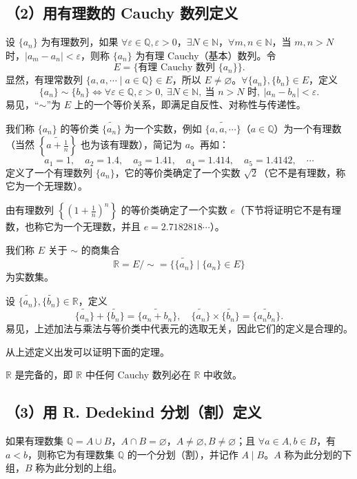 \subsection*{（2）用有理数的 Cauchy 数列定义}
设 $\{a_n\}$ 为有理数列，如果 $\forall \varepsilon \in \mathbb{Q}, \varepsilon > 0$，$\exists N \in \mathbb{N}$，$\forall m, n \in \mathbb{N}$，当 $m, n > N$ 时，$|a_m - a_n| < \varepsilon$，则称 $\{a_n\}$ 为有理 Cauchy（基本）数列。令
\[
E = \{\text{有理 Cauchy 数列 } \{a_n\}\}.
\]
显然，有理常数列 $\{a, a, \cdots \mid a \in \mathbb{Q}\} \in E$，所以 $E \neq \varnothing$。$\forall \{a_n\}, \{b_n\} \in E$，定义
\[
\{a_n\} \sim \{b_n\} \iff \forall \varepsilon \in \mathbb{Q}, \varepsilon > 0,\ \exists N \in \mathbb{N},\ \text{当 } n > N \text{ 时},\ |a_n - b_n| < \varepsilon.
\]
易见，“$\sim$”为 $E$ 上的一个等价关系，即满足自反性、对称性与传递性。

我们称 $\{a_n\}$ 的等价类 $\widetilde{\{a_n\}}$ 为一个实数，例如 $\widetilde{\{a, a, \cdots\}}$（$a \in \mathbb{Q}$）为一个有理数（当然 $\left\{\widetilde{a + \frac{1}{n}}\right\}$ 也为该有理数），简记为 $a$。再如：
\[
a_1 = 1,\quad a_2 = 1.4,\quad a_3 = 1.41,\quad a_4 = 1.414,\quad a_5 = 1.4142,\quad \cdots
\]
定义了一个有理数列 $\{a_n\}$，它的等价类确定了一个实数 $\sqrt{2}$（它不是有理数，称它为一个无理数）。

由有理数列 $\left\{\left(1 + \frac{1}{n}\right)^n\right\}$ 的等价类确定了一个实数 $e$（下节将证明它不是有理数，也称它为一个无理数，并且 $e = 2.7182818\cdots$）。

我们称 $E$ 关于 $\sim$ 的商集合
\[
\mathbb{R} = E/{\sim} = \{\widetilde{\{a_n\}} \mid \{a_n\} \in E\}
\]
为实数集。

设 $\widetilde{\{a_n\}}, \widetilde{\{b_n\}} \in \mathbb{R}$，定义
\[
\widetilde{\{a_n\}} + \widetilde{\{b_n\}} = \widetilde{\{a_n + b_n\}},\quad \widetilde{\{a_n\}} \times \widetilde{\{b_n\}} = \widetilde{\{a_n b_n\}}.
\]
易见，上述加法与乘法与等价类中代表元的选取无关，因此它们的定义是合理的。

从上述定义出发可以证明下面的定理。

\begin{theorem}[实数连续性命题（七）]\label{thm:1.3.8}
$\mathbb{R}$ 是完备的，即 $\mathbb{R}$ 中任何 Cauchy 数列必在 $\mathbb{R}$ 中收敛。
\end{theorem}

\subsection*{（3）用 R. Dedekind 分划（割）定义}
如果有理数集 $\mathbb{Q} = A \cup B$，$A \cap B = \varnothing$，$A \neq \varnothing, B \neq \varnothing$；且 $\forall a \in A, b \in B$，有 $a < b$，则称它为有理数集 $\mathbb{Q}$ 的一个分划（割），并记作 $A \mid B$。$A$ 称为此分划的下组，$B$ 称为此分划的上组。

